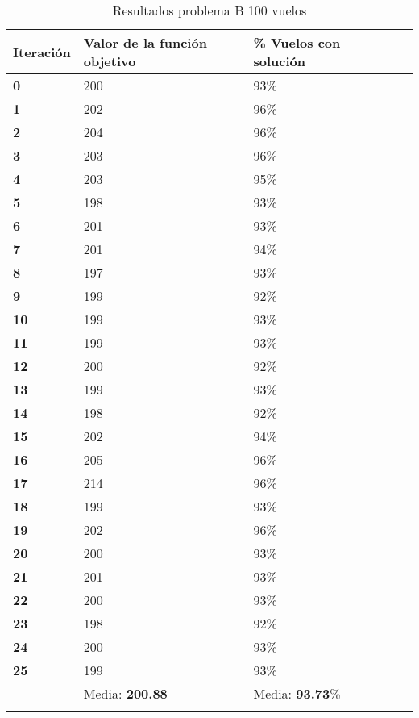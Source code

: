 \begin{longtable}{| p{} | p{} |  p{} | p{}  | p{} | }
	\hline
	\textbf{Iteración} & \textbf{Valor de la función objetivo} &\textbf{\% Vuelos con solución} \\ \hline
	\textbf{0} &200  &93\%  \\ \hline
	\textbf{1} &202  &96\%  \\ \hline
	\textbf{2} &204  &96\%  \\ \hline
	\textbf{3} &203  &96\%  \\ \hline
	\textbf{4} &203  &95\%  \\ \hline
	\textbf{5} &198  &93\%  \\ \hline
	\textbf{6} &201  &93\%  \\ \hline
	\textbf{7} &201  &94\%  \\ \hline
	\textbf{8} &197  &93\%  \\ \hline
	\textbf{9} &199  &92\%  \\ \hline
	\textbf{10} &199  &93\%  \\ \hline
	\textbf{11} &199  &93\%  \\ \hline
	\textbf{12} &200  &92\%  \\ \hline
	\textbf{13} &199  &93\%  \\ \hline
	\textbf{14} &198  &92\%  \\ \hline
	\textbf{15} &202  &94\%  \\ \hline
	\textbf{16} &205  &96\%  \\ \hline
	\textbf{17} &214  &96\%  \\ \hline
	\textbf{18} &199  &93\%  \\ \hline
	\textbf{19} &202  &96\%  \\ \hline
	\textbf{20} &200  &93\%  \\ \hline
	\textbf{21} &201  &93\%  \\ \hline
	\textbf{22} &200  &93\%  \\ \hline
	\textbf{23} &198  &92\%  \\ \hline
	\textbf{24} &200  &93\%  \\ \hline
	\textbf{25} &199  &93\%  \\ \hline
				&Media: \textbf{200.88}  &Media: \textbf{93.73}\%  \\ \hline
	\caption{Resultados problema B 100 vuelos } 
	\label{tab: Resultados problema B 100 vuelos}

	
\end{longtable}



